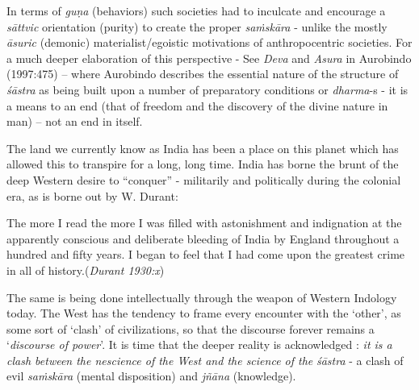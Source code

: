 In terms of {\sl guṇa} (behaviors) such societies had to inculcate and encourage a {\sl sāttvic} orientation (purity) to create the proper {\sl saṁskāra} - unlike the mostly {\sl āsuric} (demonic) materialist/egoistic motivations of anthropocentric societies. For a much deeper elaboration of this perspective - See {\sl Deva} and {\sl Asura} in Aurobindo (1997:475) -- where Aurobindo describes the essential nature of the structure of {\sl śāstra} as being built upon a number of preparatory conditions or {\sl dharma}-s - it is a means to an end (that of freedom and the discovery of the divine nature in man) – not an end in itself.

The land we currently know as India has been a place on this planet which has allowed this to transpire for a long, long time. India has borne the brunt of the deep Western desire to ``conquer'' - militarily and politically during the colonial era, as is borne out by W. Durant:
\begin{myquote}
The more I read the more I was filled with astonishment and indignation at the apparently conscious and deliberate bleeding of India by England throughout a hundred and fifty years. I began to feel that I had come upon the greatest crime in all of history.\hfill  ({\sl Durant 1930:x})
\end{myquote}
The same is being done intellectually through the weapon of Western Indology today. The West has the tendency to frame every encounter with the `other', as some sort of `clash' of civilizations, so that the discourse forever remains a `{\sl discourse of power}'. It is time that the deeper reality is acknowledged : {\sl it is a clash between the nescience of the West and the science of the} {{\sl śāstra}\relax} - a clash of evil {\sl saṁskāra} (mental disposition) and {\sl jñāna} (knowledge).\\[-15pt]

